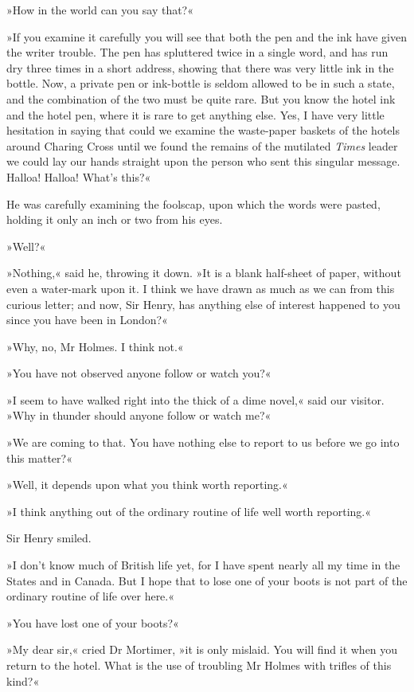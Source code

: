 »How in the world can you say that?«

»If you examine it carefully you will see that both the pen and the ink have given the writer trouble. The pen has spluttered twice in a single word, and has run dry three times in a short address, showing that there was very little ink in the bottle. Now, a private pen or ink-bottle is seldom allowed to be in such a state, and the combination of the two must be quite rare. But you know the hotel ink and the hotel pen, where it is rare to get anything else. Yes, I have very little hesitation in saying that could we examine the waste-paper baskets of the hotels around Charing Cross until we found the remains of the mutilated \textit{Times} leader we could lay our hands straight upon the person who sent this singular message. Halloa! Halloa! What's this?«

He was carefully examining the foolscap, upon which the words were pasted, holding it only an inch or two from his eyes.

»Well?«

»Nothing,« said he, throwing it down. »It is a blank half-sheet of paper, without even a water-mark upon it. I think we have drawn as much as we can from this curious letter; and now, Sir Henry, has anything else of interest happened to you since you have been in London?«

»Why, no, Mr Holmes. I think not.«

»You have not observed anyone follow or watch you?«

»I seem to have walked right into the thick of a dime novel,« said our visitor. »Why in thunder should anyone follow or watch me?«

»We are coming to that. You have nothing else to report to us before we go into this matter?«

»Well, it depends upon what you think worth reporting.«

»I think anything out of the ordinary routine of life well worth reporting.«

Sir Henry smiled.

»I don't know much of British life yet, for I have spent nearly all my time in the States and in Canada. But I hope that to lose one of your boots is not part of the ordinary routine of life over here.«

»You have lost one of your boots?«

»My dear sir,« cried Dr Mortimer, »it is only mislaid. You will find it when you return to the hotel. What is the use of troubling Mr Holmes with trifles of this kind?«

